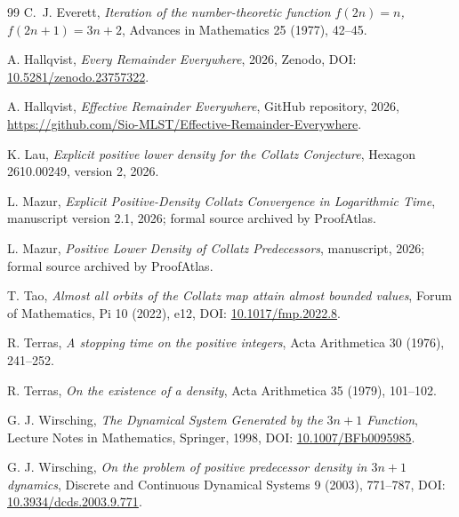 \documentclass[11pt]{article}
\theoremstyle{definition}
\theoremstyle{remark}
\begin{document}
\begin{thebibliography}{99}
C.~J. Everett,
\emph{Iteration of the number-theoretic function $f(2n)=n$, $f(2n+1)=3n+2$},
Advances in Mathematics 25 (1977), 42--45.

A. Hallqvist,
\emph{Every Remainder Everywhere}, 2026,
Zenodo, DOI: \href{https://doi.org/10.5281/zenodo.23757322}{10.5281/zenodo.23757322}.

A. Hallqvist,
\emph{Effective Remainder Everywhere}, GitHub repository, 2026,
\url{https://github.com/Sio-MLST/Effective-Remainder-Everywhere}.

K. Lau,
\emph{Explicit positive lower density for the Collatz Conjecture},
Hexagon 2610.00249, version 2, 2026.

L. Mazur,
\emph{Explicit Positive-Density Collatz Convergence in Logarithmic Time},
manuscript version 2.1, 2026; formal source archived by ProofAtlas.

L. Mazur,
\emph{Positive Lower Density of Collatz Predecessors},
manuscript, 2026; formal source archived by ProofAtlas.

T. Tao,
\emph{Almost all orbits of the Collatz map attain almost bounded values},
Forum of Mathematics, Pi 10 (2022), e12,
DOI: \href{https://doi.org/10.1017/fmp.2022.8}{10.1017/fmp.2022.8}.

R. Terras,
\emph{A stopping time on the positive integers},
Acta Arithmetica 30 (1976), 241--252.

R. Terras,
\emph{On the existence of a density},
Acta Arithmetica 35 (1979), 101--102.

G. J. Wirsching,
\emph{The Dynamical System Generated by the $3n+1$ Function},
Lecture Notes in Mathematics, Springer, 1998,
DOI: \href{https://doi.org/10.1007/BFb0095985}{10.1007/BFb0095985}.

G. J. Wirsching,
\emph{On the problem of positive predecessor density in $3n+1$ dynamics},
Discrete and Continuous Dynamical Systems 9 (2003), 771--787,
DOI: \href{https://doi.org/10.3934/dcds.2003.9.771}{10.3934/dcds.2003.9.771}.
\end{thebibliography}
\end{document}
